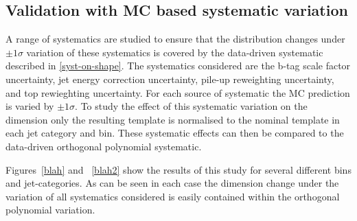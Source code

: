 \subsection{Validation with MC based systematic variation}
\label{sec:mcSystStudiesShape}
A range of systematics are studied to ensure that the \mht distribution changes under $\pm1\sigma$ variation
of these systematics is covered by the data-driven systematic described in \ref{syst-on-shape}. The systematics
considered are the b-tag scale factor uncertainty, jet energy correction uncertainty, pile-up reweighting uncertainty,
and top \Pt rewieghting uncertainty. For each source of systematic the MC prediction is varied by $\pm1\sigma$.
To study the effect of this systematic variation on the \mht dimension only the resulting template is normalised
to the nominal template in each jet category and \ht bin. These systematic effects can then be compared to the
data-driven orthogonal polynomial systematic. 

Figures~\ref{blah} and ~\ref{blah2} show the results of this study for several different \ht bins and jet-categories.
As can be seen in each case the \mht dimension change under the variation of all systematics considered is easily
contained within the orthogonal polynomial variation.

